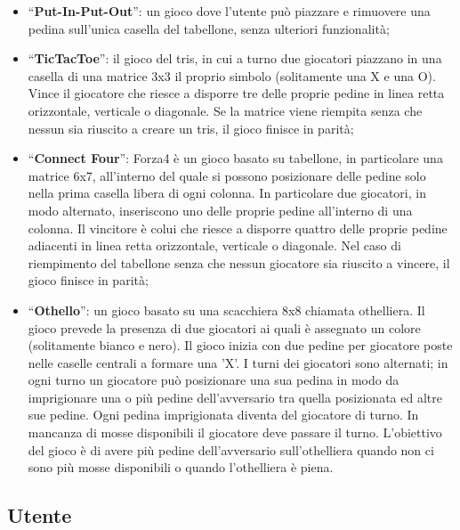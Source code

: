 \begin{itemize}
    \item ``\textbf{Put-In-Put-Out}'': un gioco dove l'utente può piazzare e rimuovere una pedina sull'unica casella del tabellone, senza ulteriori funzionalità;
    \item ``\textbf{TicTacToe}'': il gioco del tris, in cui a turno due giocatori piazzano in una casella di una matrice 3x3 il proprio simbolo (solitamente una X e una O).
    Vince il giocatore che riesce a disporre tre delle proprie pedine in linea retta orizzontale, verticale o diagonale.
    Se la matrice viene riempita senza che nessun sia riuscito a creare un tris, il gioco finisce in parità;
    \item ``\textbf{Connect Four}'': Forza4 è un gioco basato su tabellone, in particolare una matrice 6x7, all'interno del quale si possono posizionare delle pedine solo nella prima casella libera di ogni colonna.
    In particolare due giocatori, in modo alternato, inseriscono uno delle proprie pedine all'interno di una colonna.
    Il vincitore è colui che riesce a disporre quattro delle proprie pedine adiacenti in linea retta orizzontale, verticale o diagonale.
    Nel caso di riempimento del tabellone senza che nessun giocatore sia riuscito a vincere, il gioco finisce in parità;
    \item ``\textbf{Othello}'': un gioco basato su una scacchiera 8x8 chiamata othelliera.
    Il gioco prevede la presenza di due giocatori ai quali è assegnato un colore (solitamente bianco e nero). 
    Il gioco inizia con due pedine per giocatore poste nelle caselle centrali a formare una 'X'.
    I turni dei giocatori sono alternati; in ogni turno un giocatore può posizionare una sua pedina in modo da imprigionare una o più pedine dell'avversario tra quella posizionata ed altre sue pedine.
    Ogni pedina imprigionata diventa del giocatore di turno. 
    In mancanza di mosse disponibili il giocatore deve passare il turno.
    L'obiettivo del gioco è di avere più pedine dell'avversario sull'othelliera quando non ci sono più mosse disponibili o quando l'othelliera è piena.
\end{itemize}

\subsection{Utente}

